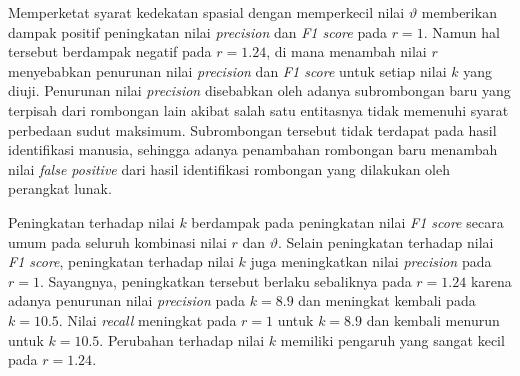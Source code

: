 Memperketat syarat kedekatan spasial dengan memperkecil nilai $\vartheta$ memberikan dampak positif peningkatan nilai \textit{precision} dan \textit{F1 score} pada $r = 1$. Namun hal tersebut berdampak negatif pada $r = 1.24$, di mana menambah nilai $r$ menyebabkan penurunan nilai \textit{precision} dan \textit{F1 score} untuk setiap nilai $k$ yang diuji. Penurunan nilai \textit{precision} disebabkan oleh adanya subrombongan baru yang terpisah dari rombongan lain akibat salah satu entitasnya tidak memenuhi syarat perbedaan sudut maksimum. Subrombongan tersebut tidak terdapat pada hasil identifikasi manusia, sehingga adanya penambahan rombongan baru menambah nilai \textit{false positive} dari hasil identifikasi rombongan yang dilakukan oleh perangkat lunak.

Peningkatan terhadap nilai $k$ berdampak pada peningkatan nilai \textit{F1 score} secara umum pada seluruh kombinasi nilai $r$ dan $\vartheta$. Selain peningkatan terhadap nilai \textit{F1 score}, peningkatan terhadap nilai $k$ juga meningkatkan nilai \textit{precision} pada $r = 1$. Sayangnya, peningkatkan tersebut berlaku sebaliknya pada $r = 1.24$ karena adanya penurunan nilai \textit{precision} pada $k = 8.9$ dan meningkat kembali pada $k = 10.5$. Nilai \textit{recall} meningkat pada $r = 1$ untuk $k = 8.9$ dan kembali menurun untuk $k = 10.5$. Perubahan terhadap nilai $k$ memiliki pengaruh yang sangat kecil pada $r = 1.24$.


